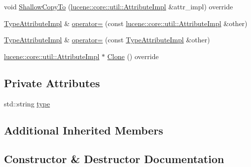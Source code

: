 \begin{DoxyCompactItemize}
\item 
void \mbox{\hyperlink{classlucene_1_1core_1_1analysis_1_1tokenattributes_1_1TypeAttributeImpl_a2eefa7e33a6e060c5493711cd60c9d2e}{Shallow\+Copy\+To}} (\mbox{\hyperlink{classlucene_1_1core_1_1util_1_1AttributeImpl}{lucene\+::core\+::util\+::\+Attribute\+Impl}} \&attr\+\_\+impl) override
\item 
\mbox{\hyperlink{classlucene_1_1core_1_1analysis_1_1tokenattributes_1_1TypeAttributeImpl}{Type\+Attribute\+Impl}} \& \mbox{\hyperlink{classlucene_1_1core_1_1analysis_1_1tokenattributes_1_1TypeAttributeImpl_a873153f88f6ec5485c4a0bed1374bb9b}{operator=}} (const \mbox{\hyperlink{classlucene_1_1core_1_1util_1_1AttributeImpl}{lucene\+::core\+::util\+::\+Attribute\+Impl}} \&other)
\item 
\mbox{\hyperlink{classlucene_1_1core_1_1analysis_1_1tokenattributes_1_1TypeAttributeImpl}{Type\+Attribute\+Impl}} \& \mbox{\hyperlink{classlucene_1_1core_1_1analysis_1_1tokenattributes_1_1TypeAttributeImpl_ac7ab1e84d8128fd82a86629c321f558b}{operator=}} (const \mbox{\hyperlink{classlucene_1_1core_1_1analysis_1_1tokenattributes_1_1TypeAttributeImpl}{Type\+Attribute\+Impl}} \&other)
\item 
\mbox{\hyperlink{classlucene_1_1core_1_1util_1_1AttributeImpl}{lucene\+::core\+::util\+::\+Attribute\+Impl}} $\ast$ \mbox{\hyperlink{classlucene_1_1core_1_1analysis_1_1tokenattributes_1_1TypeAttributeImpl_a3549b01075ae899b2e6dcfa7aa101eca}{Clone}} () override
\end{DoxyCompactItemize}
\subsection*{Private Attributes}
\begin{DoxyCompactItemize}
\item 
std\+::string \mbox{\hyperlink{classlucene_1_1core_1_1analysis_1_1tokenattributes_1_1TypeAttributeImpl_ad5781cf6585610066317c74d5d4a4f1c}{type}}
\end{DoxyCompactItemize}
\subsection*{Additional Inherited Members}


\subsection{Constructor \& Destructor Documentation}
\mbox{\label{classlucene_1_1core_1_1analysis_1_1tokenattributes_1_1TypeAttributeImpl_a49d2f823e9f9e40eaf4778ca6c891004}} 
